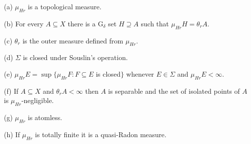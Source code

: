 (a) $\mu_{Hr}$ is a topological measure.

(b) For every $A\subseteq X$ there is a G$_{\delta}$ set
$H\supseteq A$ such that $\mu_{Hr}H=\theta_rA$.

(c) $\theta_r$ is the outer measure defined from $\mu_{Hr}$.

(d) $\Sigma$ is closed under Souslin's operation.

(e) $\mu_{Hr}E=\sup\{\mu_{Hr}F:F\subseteq E$ is closed$\}$ whenever
$E\in\Sigma$ and $\mu_{Hr}E<\infty$.

(f) If $A\subseteq X$ and $\theta_rA<\infty$ then $A$ is separable and
the set of isolated points of $A$ is $\mu_{Hr}$-negligible.

(g) $\mu_{Hr}$ is atomless.

(h) If $\mu_{Hr}$ is totally finite it is a quasi-Radon measure.

